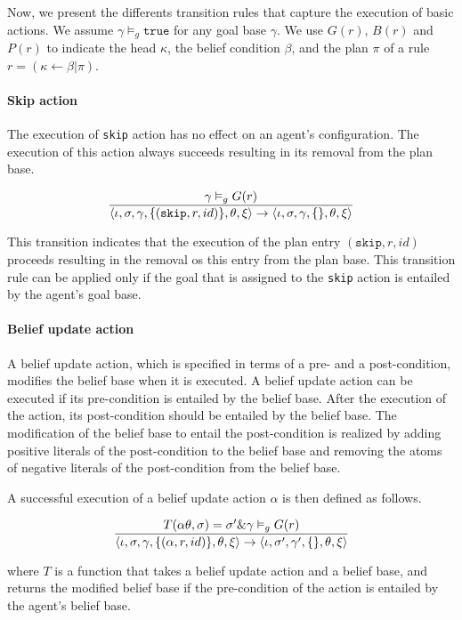 \documentclass[a4paper]{article}
\begin{document}
Now, we present the differents transition rules that capture the execution of basic actions. We assume $\gamma \vDash_{g} \texttt{true}$ for any goal base $\gamma$. We use $G(r)$, $B(r)$ and $P(r)$ to indicate the head $\kappa$, the belief condition $\beta$, and the plan $\pi$ of a rule $r = (\kappa \leftarrow \beta \vert \pi)$.

\paragraph{Skip action}

The execution of \texttt{skip} action has no effect on an agent's conﬁguration. The execution of
this action always succeeds resulting in its removal from the plan base.

$$ {{\gamma \vDash_{g} G(r)}\over{\langle \iota, \sigma, \gamma, \{(\texttt{skip}, r, id)\}, \theta, \xi \rangle  \rightarrow \langle \iota, \sigma, \gamma, \{\}, \theta, \xi \rangle}}$$

This transition indicates that the execution of the plan entry $(\texttt{skip}, r, id)$ proceeds resulting in the removal os this entry from the plan base. This transition rule can be applied only if the goal that is assigned to the \texttt{skip} action is entailed by the agent's goal base.

\paragraph{Belief update action}

A belief update action, which is speciﬁed in terms of a pre- and a post-condition, modiﬁes the belief base when it is executed. A belief update action can be executed if its pre-condition is entailed by the belief base. After the execution of the action, its post-condition should be entailed by the belief base. The modiﬁcation of the belief base to entail the post-condition is realized by adding positive literals of the post-condition to the belief base and removing the atoms of negative literals of the post-condition from the belief base.

A successful execution of a belief update action $\alpha$ is then deﬁned as follows.

$$ {{T(\alpha \theta, \sigma) = \sigma' \& \gamma \vDash_{g} G(r)} \over {\langle \iota, \sigma, \gamma, \{(\alpha, r, id)\}, \theta, \xi \rangle  \rightarrow \langle \iota, \sigma', \gamma', \{\}, \theta, \xi \rangle}} $$

where $T$ is a function that takes a belief update action and a belief base, and returns the modiﬁed belief base if the pre-condition of the action is entailed by the agent's belief base.
\end{document}
